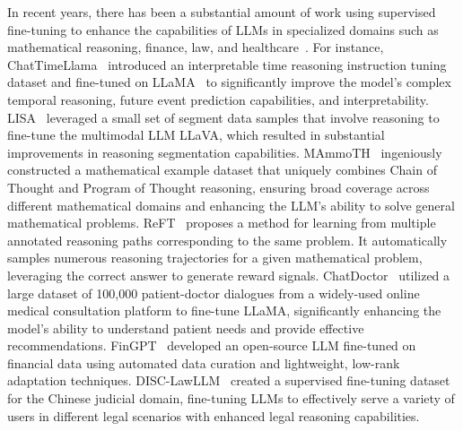 In recent years, there has been a substantial amount of work using supervised fine-tuning to enhance the capabilities of LLMs in specialized domains such as mathematical reasoning, finance, law, and healthcare~\cite{yu2022alert, zong2023solving, yang2024leandojo}. For instance, ChatTimeLlama~\cite{yuan2024back} introduced an interpretable time reasoning instruction tuning dataset and fine-tuned on LLaMA~\cite{touvron2023llama1} to significantly improve the model's complex temporal reasoning, future event prediction capabilities, and interpretability. LISA~\cite{lai2024lisa} leveraged a small set of segment data samples that involve reasoning to fine-tune the multimodal LLM LLaVA, which resulted in substantial improvements in reasoning segmentation capabilities. MAmmoTH~\cite{yue2023mammoth} ingeniously constructed a mathematical example dataset that uniquely combines Chain of Thought and Program of Thought reasoning, ensuring broad coverage across different mathematical domains and enhancing the LLM's ability to solve general mathematical problems. ReFT~\cite{trung2024reft} proposes a method for learning from multiple annotated reasoning paths corresponding to the same problem. It automatically samples numerous reasoning trajectories for a given mathematical problem, leveraging the correct answer to generate reward signals. ChatDoctor~\cite{li2023chatdoctor} utilized a large dataset of 100,000 patient-doctor dialogues from a widely-used online medical consultation platform to fine-tune LLaMA, significantly enhancing the model's ability to understand patient needs and provide effective recommendations. FinGPT~\cite{yang2023fingpt} developed an open-source LLM fine-tuned on financial data using automated data curation and lightweight, low-rank adaptation techniques. DISC-LawLLM~\cite{yue2023disc} created a supervised fine-tuning dataset for the Chinese judicial domain, fine-tuning LLMs to effectively serve a variety of users in different legal scenarios with enhanced legal reasoning capabilities.